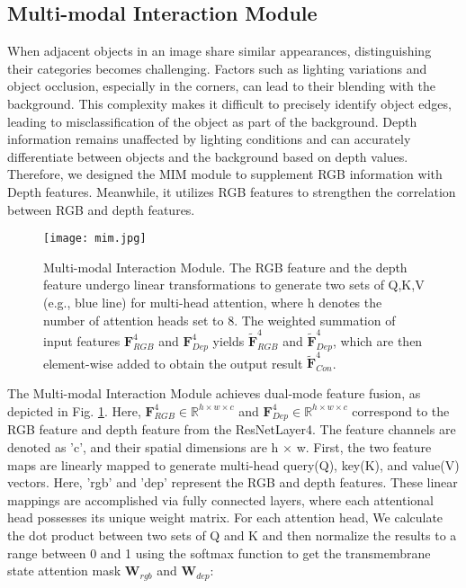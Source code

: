 \documentclass{aims}
\numberwithin{equation}{section}
\begin{document}
\subsection{Multi-modal Interaction Module}  

When adjacent objects in an image share similar appearances, distinguishing their categories becomes challenging. Factors such as lighting variations and object occlusion, especially in the corners, can lead to their blending with the background. This complexity makes it difficult to precisely identify object edges, leading to misclassification of the object as part of the background. Depth information remains unaffected by lighting conditions and can accurately differentiate between objects and the background based on depth values. Therefore, we designed the MIM module to supplement RGB information with Depth features. Meanwhile, it utilizes RGB features to strengthen the correlation between RGB and depth features.

\begin{figure}[t]
	\centering
		\centering
\centering
\texttt{[image: mim.jpg]}
\caption{Multi-modal Interaction Module. The RGB feature and the depth feature undergo linear transformations to generate two sets of Q,K,V (e.g., blue line) for multi-head attention, where h denotes the number of attention heads set to 8. The weighted summation of input features ${\bm F}_{RGB}^{4}$ and ${\bm F}_{Dep}^{4}$ yields $\tilde{\bm F}_{RGB}^{4}$ and $\tilde{\bm F}_{Dep}^{4}$, which are then element-wise added to obtain the output result $\tilde{\bm F}_{Con}^{4}$. \label{fig:MIM}}
\end{figure}

The Multi-modal Interaction Module achieves dual-mode feature fusion, as depicted in Fig. \ref{fig:MIM}. Here, ${\bm F}_{RGB}^{4}\in {\mathbb{R}}^{h\times w\times c}$ and ${\bm F}_{Dep}^{4}\in {\mathbb{R}}^{h\times w\times c}$ correspond to the RGB feature and depth feature from the ResNetLayer4. The feature channels are denoted as 'c', and their spatial dimensions are h $\times$ w. First, the two feature maps are linearly mapped to generate multi-head query(Q), key(K), and value(V) vectors. Here, 'rgb' and 'dep' represent the RGB and depth features. These linear mappings are accomplished via fully connected layers, where each attentional head possesses its unique weight matrix. For each attention head, We calculate the dot product between two sets of Q and K and then normalize the results to a range between 0 and 1 using the softmax function to get the transmembrane state attention mask ${\bm W}_{rgb}$ and ${\bm W}_{dep}$:
\end{document}

